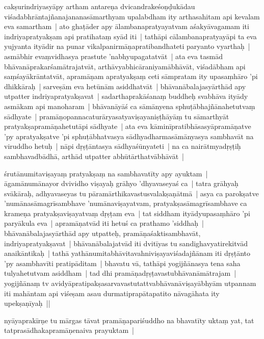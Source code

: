 \documentclass[article,12pt,a4paper]{memoir}%
\newcounter{parCount}
\begin{document}
	  \pstart \leavevmode%
	\label{thakur75-19.31}cakṣurindriyasyāpy artham antareṇa dvicandrakeśoṇḍukādau viśadabhrāntajñanajananasāmarthyam upalabdham ity arthasahitam api kevalam eva samartham | ato ghaṭāder apy ālambanapratyayatvam aśakyāvagamam iti indriyapratyakṣam api pratihataṃ syād iti | tathāpi cālambanapratyayāpi ta eva yujyanta ityādir na punar vikalpanirmāṇapratibandhateti paryanto vyarthaḥ | asmābhir evaṃvidhasya prastute 'nabhyupagatatvāt | ata eva tasmād bhāvanāprakarśamātrajatvāt, arthāvyabhicāraniyamābhāvāt, viśadābham api saṃśayākrāntatvāt, apramāṇam apratyakṣaṃ ceti sāmpratam ity upasaṃhāro 'pi dhikkāraḥ | sarveṣām eva hetūnām asiddhatvāt | bhāvanābalajasyārthād apy utpatter indriyapratyakṣavat | sadarthaprakāśanaṃ buddheḥ svabhāva ityādy asmākam api manoharam | bhāvanāyāś ca sāmānyena sphuṭābhajñānahetutvaṃ sādhyate | pramāṇopannacaturāryasatyaviṣayaniṣṭhāyāṃ tu sāmarthyāt pratyakṣapramāṇahetutāpi sādhyate | ata eva kāminīpratibhāsasyāpramāṇatve 'py apratyakṣatve 'pi sphuṭābhatvasya sādhyadharmasāmānyasya sambhavāt na viruddho hetuḥ | nāpi dṛṣṭāntasya sādhyaśūnyateti | na ca nairātmyadṛṣṭiḥ sambhavadbādhā, arthād utpatter abhūtārthatvābhāvāt | 
	{}
	\pend%
      

	  \pstart \leavevmode%
	\label{thakur75-20.11}śrutānumitaviṣayaṃ pratyakṣaṃ na sambhavatīty apy ayuktam | āgamānumānayor dvividho viṣayaḥ grāhyo 'dhyavaseyaś ca | tatra grāhyaḥ svākāraḥ, adhyavaseyas tu pāramārthikavastusvalakṣaṇātmā | asya ca parokṣatve 'numānasāmagrīsambhave 'numānaviṣayatvam, pratyakṣasāmagrīsambhave ca krameṇa pratyakṣaviṣayatvaṃ dṛṣṭam eva | tat siddham ityādyupasaṃhāro 'pi paryākula eva | apramāṇatvād iti hetuś ca prathamo 'siddhaḥ | bhāvanābalajasyārthād apy utpatteḥ, pramāṇaśaktisambhavāt, indriyapratyakṣavat | bhāvanābalajatvād iti dvitīyas tu sandighavyatirekitvād anaikāntikaḥ | tathā yathānumitabhāvitavahniviṣayaviśadajñānam iti dṛṣṭānto 'py asambhavīti pratipāditam | bhavatu vā, tathāpi yogijñānasya tena saha tulyahetutvam asiddham | tad dhi pramāṇadṛṣṭavastubhāvanāmātrajam | yogijñānaṃ tv avidyāpratipakṣasarvavastutattvabhāvanāviṣayābhyām utpannam iti mahāntam api viśeṣam asau durmatiprapātapatito nāvagāhata ity upekṣaṇīyaḥ || 
	{}
	\pend%
      

	  \pstart \leavevmode%
	\label{thakur75-20.21}nyāyaprakīrṇe tu mārgas tāvat pramāṇapariśuddho na bhavatīty uktaṃ yat, tat tatprasādhakapramāṇenaiva prayuktam | 
	{}
	\pend%
      
\end{document}
